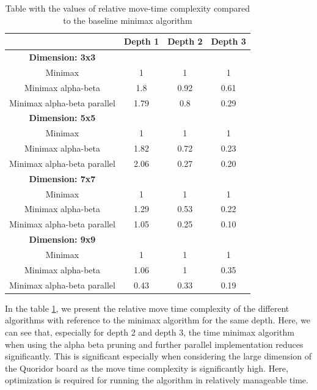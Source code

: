 \begin{table}[ht]
    \centering
     \begin{tabular}{|c|c|c|c|}\hline
          & Depth 1 & Depth 2 & Depth 3\\ \hline 
          \textbf{Dimension: 3x3}  &    &    &     \\ \hline
          Minimax  &  1  &   1 &   1  \\ \hline
          Minimax alpha-beta &  1.8 &  0.92 &  0.61 \\ \hline
          Minimax alpha-beta parallel & 1.79 & 0.8& 0.29  \\ \hline
          \textbf{Dimension: 5x5}  &    &    &     \\ \hline
          Minimax  &  1  &   1 &   1  \\ \hline
          Minimax alpha-beta &  1.82 &  0.72 &  0.23 \\ \hline
          Minimax alpha-beta parallel & 2.06 & 0.27 & 0.20  \\ \hline
          \textbf{Dimension: 7x7}  &    &    &     \\ \hline
          Minimax  &  1  &   1 &   1  \\ \hline
          Minimax alpha-beta &  1.29 &  0.53 &  0.22 \\ \hline
          Minimax alpha-beta parallel & 1.05 & 0.25 & 0.10 \\ \hline
          \textbf{Dimension: 9x9} &    &    &     \\ \hline
          Minimax  &  1  &   1 &   1  \\ \hline
          Minimax alpha-beta &  1.06 &  1 &  0.35 \\ \hline
          Minimax alpha-beta parallel & 0.43 & 0.33 & 0.19  \\ \hline
     \end{tabular}
     \caption{Table with the values of relative move-time complexity compared to the baseline minimax algorithm}
     \label{tab:complexity}
 \end{table}

In the table \ref{tab:complexity}, we present the relative move time complexity of the different algorithms with reference to the minimax algorithm for the same depth. Here, we can see that, especially for depth 2 and depth 3, the time minimax algorithm when using the alpha beta pruning and further parallel implementation reduces significantly. This is significant especially when considering the large dimension of the Quoridor board as the move time complexity is significantly high. Here, optimization is required for running the algorithm in relatively manageable time.

